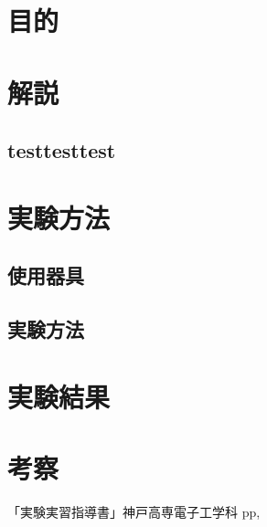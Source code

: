 \documentclass[11pt]{jarticle}
\title{}
\begin{document}
\maketitle

\section{目的}

\section{解説}
	\subsection{testtesttest}
\section{実験方法}
	\subsection{使用器具}
	\subsection{実験方法}
\section{実験結果}
\section{考察}
\begin{thebibliography}{99}
「実験実習指導書」神戸高専電子工学科 pp,
\end{thebibliography}
\end{document}
